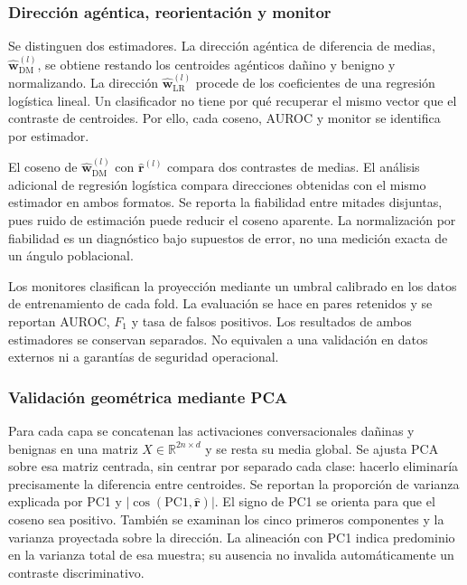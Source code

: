 \subsubsection*{Dirección agéntica, reorientación y monitor}

Se distinguen dos estimadores. La dirección agéntica de diferencia de medias, $\hat{\bm{w}}_{\mathrm{DM}}^{(l)}$, se obtiene restando los centroides agénticos dañino y benigno y normalizando. La dirección $\hat{\bm{w}}_{\mathrm{LR}}^{(l)}$ procede de los coeficientes de una regresión logística lineal. Un clasificador no tiene por qué recuperar el mismo vector que el contraste de centroides. Por ello, cada coseno, AUROC y monitor se identifica por estimador.

El coseno de $\hat{\bm{w}}_{\mathrm{DM}}^{(l)}$ con $\hat{\bm{r}}^{(l)}$ compara dos contrastes de medias. El análisis adicional de regresión logística compara direcciones obtenidas con el mismo estimador en ambos formatos. Se reporta la fiabilidad entre mitades disjuntas, pues ruido de estimación puede reducir el coseno aparente. La normalización por fiabilidad es un diagnóstico bajo supuestos de error, no una medición exacta de un ángulo poblacional.

Los monitores clasifican la proyección mediante un umbral calibrado en los datos de entrenamiento de cada fold. La evaluación se hace en pares retenidos y se reportan AUROC, $F_1$ y tasa de falsos positivos. Los resultados de ambos estimadores se conservan separados. No equivalen a una validación en datos externos ni a garantías de seguridad operacional.

\subsubsection*{Validación geométrica mediante PCA}

Para cada capa se concatenan las activaciones conversacionales dañinas y benignas en una matriz $X\in\mathbb{R}^{2n\times d}$ y se resta su media global. Se ajusta PCA sobre esa matriz centrada, sin centrar por separado cada clase: hacerlo eliminaría precisamente la diferencia entre centroides. Se reportan la proporción de varianza explicada por PC1 y $|\cos(\mathrm{PC1},\hat{\bm{r}})|$. El signo de PC1 se orienta para que el coseno sea positivo. También se examinan los cinco primeros componentes y la varianza proyectada sobre la dirección. La alineación con PC1 indica predominio en la varianza total de esa muestra; su ausencia no invalida automáticamente un contraste discriminativo.

